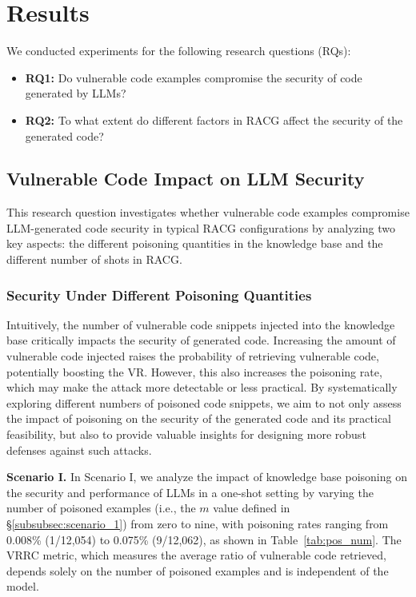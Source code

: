 \section{Results}
\label{sec:exp_results}
We conducted experiments for the following research questions (RQs):
\begin{itemize}[leftmargin=*]
    \item {\bf RQ1:} Do vulnerable code examples compromise the security of code generated by LLMs?
    \item {\bf RQ2:} To what extent do different factors in RACG affect the security of the generated code?
\end{itemize}

\subsection{Vulnerable Code Impact on LLM Security}
This research question investigates whether vulnerable code examples compromise LLM-generated code security in typical RACG configurations by analyzing two key aspects: the different poisoning quantities in the knowledge base and the different number of shots in RACG.

\subsubsection{Security Under Different Poisoning Quantities}
\label{subsec:pos_level}
Intuitively, the number of vulnerable code snippets injected into the knowledge base critically impacts the security of generated code. Increasing the amount of vulnerable code injected raises the probability of retrieving vulnerable code, potentially boosting the VR. However, this also increases the poisoning rate, which may make the attack more detectable or less practical. By systematically exploring different numbers of poisoned code snippets, we aim to not only assess the impact of poisoning on the security of the generated code and its practical feasibility, but also to provide valuable insights for designing more robust defenses against such attacks. 


\textbf{Scenario I.} In Scenario I, we analyze the impact of knowledge base poisoning on the security and performance of LLMs in a one-shot setting by varying the number of poisoned examples (i.e., the $m$ value defined in \S\ref{subsubsec:scenario_1}) from zero to nine, with poisoning rates ranging from 0.008\% (1/12,054) to 0.075\% (9/12,062), as shown in Table~\ref{tab:pos_num}. The VRRC metric, which measures the average ratio of vulnerable code retrieved, depends solely on the number of poisoned examples and is independent of the model.


